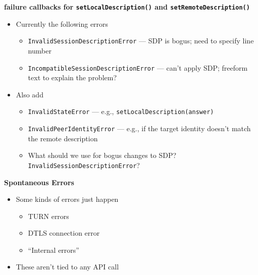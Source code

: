 \documentclass[helvetica]{seminar}
\newcommand{\heading}[1]{%
  \begin{center} 
    \large\bf 
    #1 
  \end{center} 
  \vspace{.4 in}}
\begin{document}
\begin{slide}
\heading{failure callbacks for \texttt{setLocalDescription()} and \texttt{setRemoteDescription()}}

\vspace{-4ex}

\begin{itemize}
\item Currently the following errors
  \begin{itemize}
  \item \verb^InvalidSessionDescriptionError^ --- SDP is bogus; need to specify line number
  \item \verb^IncompatibleSessionDescriptionError^ --- can't apply SDP; freeform text to explain the problem?
  \end{itemize}

\item Also add
\begin{itemize}
\item \verb^InvalidStateError^ --- e.g., \verb^setLocalDescription(answer)^ 
\item \verb^InvalidPeerIdentityError^ --- e.g., if the target identity doesn't match the remote description
\item What should we use for bogus changes to SDP? \verb^InvalidSessionDescriptionError^?
\end{itemize}

\end{itemize}
\end{slide}

\begin{slide}
\heading{Spontaneous Errors}

\begin{itemize}
\item Some kinds of errors just happen
  \begin{itemize}
  \item TURN errors
  \item DTLS connection error
  \item ``Internal errors''
  \end{itemize}

\item These aren't tied to any API call
\end{itemize}
\end{slide}
\end{document}
